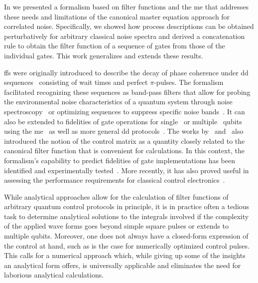In  we presented a formalism based on filter functions and the \gls{me} that addresses these needs and limitations of the canonical master equation approach for correlated noise.
Specifically, we showed how process descriptions can be obtained perturbatively for arbitrary classical noise spectra and derived a concatenation rule to obtain the filter function of a sequence of gates from those of the individual gates.
This work generalizes and extends these results.

\Glspl{ff} were originally introduced to describe the decay of phase coherence under \gls{dd} sequences~\cite{Kofman2001,Martinis2003,Uhrig2007,Cywinski2008} consisting of wait times and perfect $\pi$-pulses.
The formalism facilitated recognizing these sequences as band-pass filters that allow for probing the environmental noise characteristics of a quantum system through noise spectroscopy~\cite{Alvarez2011,Bylander2011,Paz-Silva2017,Malinowski2017} or optimizing sequences to suppress specific noise bands~\cite{Biercuk2009,Uys2009,Soare2014,Malinowski2017}.
It can also be extended to fidelities of gate operations for single~\cite{Green2012,Green2013} or multiple~\cite{Gungordu2018,Ball2020} qubits using the \gls{me}~\cite{Magnus1954,Blanes2009} as well as more general \gls{dd} protocols~\cite{Paz-Silva2014}.
The works by~\citet{Green2013} and~\citet{Clausen2010} also introduced the notion of the control matrix as a quantity closely related to the canonical filter function that is convenient for calculations.
In this context, the formalism's capability to predict fidelities of gate implementations has been identified and experimentally tested~\cite{Green2013,Kabytayev2014,Soare2014,Ball2016}.
More recently, it has also proved useful in assessing the performance requirements for classical control electronics~\cite{VanDijk2019}.

While analytical approaches allow for the calculation of filter functions of arbitrary quantum control protocols in principle, it is in practice often a tedious task to determine analytical solutions to the integrals involved if the complexity of the applied wave forms goes beyond simple square pulses or extends to multiple qubits.
Moreover, one does not always have a closed-form expression of the control at hand, such as is the case for numerically optimized control pulses.
This calls for a numerical approach which, while giving up some of the insights an analytical form offers, is universally applicable and eliminates the need for laborious analytical calculations.

